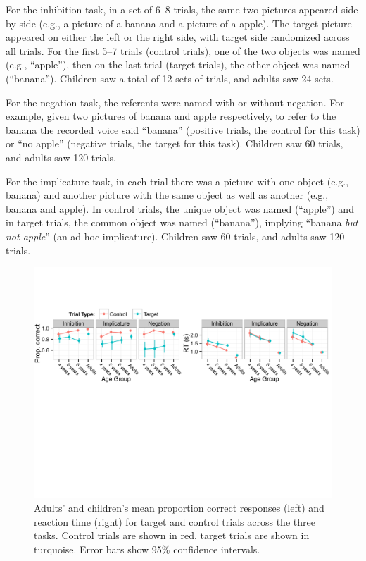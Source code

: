 \documentclass[10pt,letterpaper]{article}
\begin{document}
For the inhibition task, in a set of 6--8 trials, the same two pictures appeared side by side (e.g., a picture of a banana and a picture of a apple). The target picture appeared on either the left or the right side, with target side randomized across all trials. For the first 5--7 trials (control trials), one of the two objects was named (e.g., ``apple''), then on the last trial (target trials), the other object was named (``banana'').
Children saw a total of 12 sets of trials, and adults saw 24 sets.

For the negation task, the referents were named with or without negation. For example, given two pictures of banana and apple respectively, to refer to the banana the recorded voice said ``banana'' (positive trials, the control for this task) or ``no apple'' (negative trials, the target for this task). Children saw 60 trials, and adults saw 120 trials.

For the implicature task, in each trial there was a picture with one object (e.g., banana) and another picture with the same object as well as another (e.g., banana and apple). In control trials, the unique object was named (``apple'') and in target trials, the common object was named (``banana''), implying ``banana \emph{but not apple}'' (an ad-hoc implicature). Children saw 60 trials, and adults saw 120 trials.

\begin{figure}[t!]
\begin{center}
\includegraphics[width=\textwidth]{figures/correct_RT_v2.pdf}
\caption{\label{fig:traditional} Adults' and children's mean proportion correct responses (left) and reaction time (right) for target and control trials across the three tasks. Control trials are shown in red, target trials are shown in turquoise. Error bars show 95\% confidence intervals. }
\end{center}
\end{figure}
\end{document}
